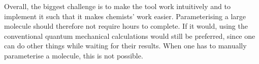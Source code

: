 Overall, the biggest challenge is to make the tool work intuitively and to implement it such that it makes chemists' work easier. Parameterising a large molecule should therefore not require hours to complete. If it would, using the conventional quantum mechanical calculations would still be preferred, since one can do other things while waiting for their results. When one has to manually parameterise a molecule, this is not possible.
